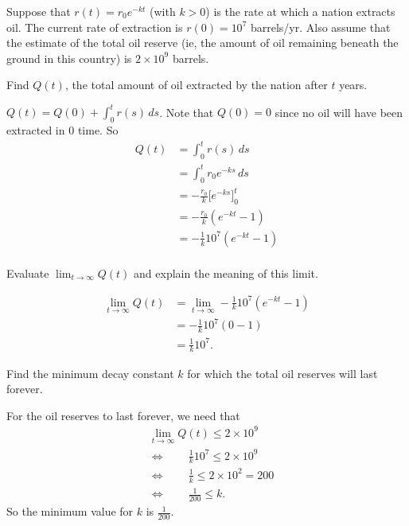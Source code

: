\documentclass[nooutcomes]{ximera}
\renewcommand{\d}{\,d}
\newcommand{\eval}[1]{\bigg[ #1 \bigg]}
\renewenvironment{freeResponse}{
\ifhandout\setbox0\vbox\bgroup\else
\begin{trivlist}\item[\hskip \labelsep\bfseries Solution:\hspace{2ex}]
\fi}
{\ifhandout\egroup\else
\end{trivlist}
\fi}
\begin{document}
\begin{problem}
Suppose that $r(t) = r_0 e^{-kt}$ (with $k>0$) is the rate at which a nation extracts oil.  
The current rate of extraction is $r(0) = 10^7$ barrels/yr.  
Also assume that the estimate of the total oil reserve (ie, the amount of oil remaining beneath the ground in this country) is $2 \times 10^9$ barrels.

	\begin{enumerate}
	
	\item  Find $Q(t)$, the total amount of oil extracted by the nation after $t$ years.
		\begin{freeResponse}
		$Q(t) = Q(0) + \int_0^t r(s) \d s$.  Note that $Q(0)=0$ since no oil will have been extracted in $0$ time.  So
			\begin{align*}
			Q(t) &= \int_0^t r(s) \d s  \\
			&= \int_0^t r_0 e^{-ks} \d s  \\
			&= - \frac{r_0}{k} \eval{e^{-ks}}_0^t  \\
			&= - \frac{r_0}{k} \left( e^{-kt} - 1 \right)  \\
			&= - \frac{1}{k} 10^7 \left(e^{-kt}-1 \right)  \\
			\end{align*}
		\end{freeResponse}
		
		
		
	\item  Evaluate $\lim_{t \to \infty} Q(t)$ and explain the meaning of this limit.
		\begin{freeResponse}
			\begin{align*}
			\lim_{t \to \infty} Q(t) &= \lim_{t \to \infty} - \frac{1}{k} 10^7 \left(e^{-kt}-1 \right)  \\
			&= - \frac{1}{k} 10^7 (0-1)  \\
			&= \frac{1}{k} 10^7.
			\end{align*}
		\end{freeResponse}
		
		
		
	\item  Find the minimum decay constant $k$ for which the total oil reserves will last forever.
		\begin{freeResponse}
		For the oil reserves to last forever, we need that
			\begin{align*}
			&\lim_{t \to \infty} Q(t) \leq 2 \times 10^9  \\
			 &\Longleftrightarrow \qquad \frac{1}{k} 10^7 \leq 2 \times 10^9  \\
			 &\Longleftrightarrow \qquad \frac{1}{k} \leq 2 \times 10^2 = 200  \\
			 &\Longleftrightarrow \qquad \frac{1}{200} \leq k.
			\end{align*}
		So the minimum value for $k$ is $\frac{1}{200}$.  
		\end{freeResponse}
		

\end{enumerate}
\end{problem}
\end{document}
